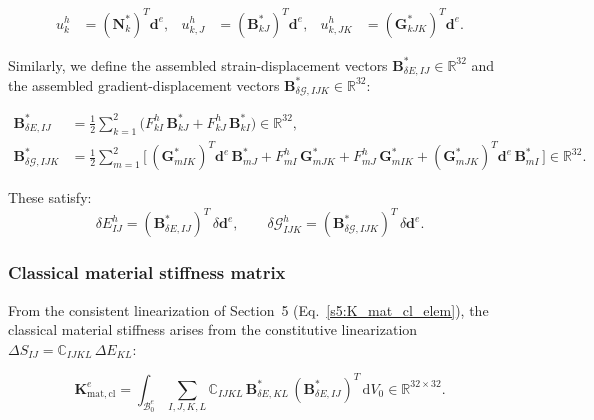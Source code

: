 \documentclass[11pt]{article}
\begin{document}
\begin{align}
u_{k}^{h} &= (\mathbf{N}_{k}^{*})^{T}\mathbf{d}^{e},
&
u_{k,J}^{h} &= (\mathbf{B}_{kJ}^{*})^{T}\mathbf{d}^{e},
&
u_{k,JK}^{h} &= (\mathbf{G}_{kJK}^{*})^{T}\mathbf{d}^{e}.
\label{s7:assembled_interp}
\end{align}

Similarly, we define the assembled strain-displacement vectors
$\mathbf{B}_{\delta E,IJ}^{*}\in\mathbb{R}^{32}$ and the assembled
gradient-displacement vectors
$\mathbf{B}_{\delta\mathcal{G},IJK}^{*}\in\mathbb{R}^{32}$:

\begin{align}
\mathbf{B}_{\delta E,IJ}^{*}
&= \tfrac12\sum_{k=1}^{2}\bigl(F_{kI}^{h}\,\mathbf{B}_{kJ}^{*}
                               + F_{kJ}^{h}\,\mathbf{B}_{kI}^{*}\bigr)
\in \mathbb{R}^{32},
\label{s7:B_deltaE_assembled}\\
\mathbf{B}_{\delta\mathcal{G},IJK}^{*}
&= \tfrac12\sum_{m=1}^{2}\bigl[\,(\mathbf{G}_{mIK}^{*})^{T}\mathbf{d}^{e}\,\mathbf{B}_{mJ}^{*}
 + F_{mI}^{h}\,\mathbf{G}_{mJK}^{*}
 + F_{mJ}^{h}\,\mathbf{G}_{mIK}^{*}
 + (\mathbf{G}_{mJK}^{*})^{T}\mathbf{d}^{e}\,\mathbf{B}_{mI}^{*}\,\bigr]
\in \mathbb{R}^{32}.
\label{s7:B_deltaG_assembled}
\end{align}

These satisfy:
\begin{equation}
\delta E_{IJ}^{h} = (\mathbf{B}_{\delta E,IJ}^{*})^{T}\,\delta\mathbf{d}^{e},
\qquad
\delta\mathcal{G}_{IJK}^{h} = (\mathbf{B}_{\delta\mathcal{G},IJK}^{*})^{T}\,\delta\mathbf{d}^{e}.
\end{equation}

\subsubsection{Classical material stiffness matrix}
\label{ssec:K_mat_cl}

From the consistent linearization of Section~5 (Eq.~\eqref{s5:K_mat_cl_elem}),
the classical material stiffness arises from the constitutive
linearization $\Delta S_{IJ} = \mathbb{C}_{IJKL}\,\Delta E_{KL}$:

\begin{equation}
\boxed{
\mathbf{K}_{\mathrm{mat,cl}}^{e}
= \int_{\mathcal{B}_{0}^{e}}
  \sum_{I,J,K,L}
  \mathbb{C}_{IJKL}\,
  \mathbf{B}_{\delta E,KL}^{*}\,
  (\mathbf{B}_{\delta E,IJ}^{*})^{T}\,
  \mathrm{d}V_{0}
\in \mathbb{R}^{32\times 32}.
}
\label{s7:K_mat_cl}
\end{equation}
\end{document}
